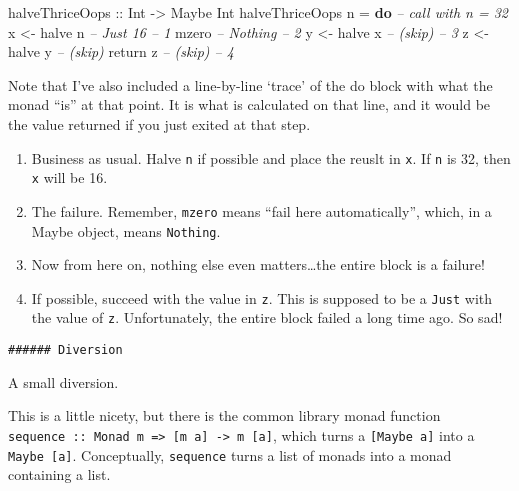 \documentclass[]{article}
\newenvironment{Shaded}{}{}
\newcommand{\KeywordTok}[1]{\textcolor[rgb]{0.00,0.44,0.13}{\textbf{{#1}}}}
\newcommand{\DataTypeTok}[1]{\textcolor[rgb]{0.56,0.13,0.00}{{#1}}}
\newcommand{\CommentTok}[1]{\textcolor[rgb]{0.38,0.63,0.69}{\textit{{#1}}}}
\newcommand{\OtherTok}[1]{\textcolor[rgb]{0.00,0.44,0.13}{{#1}}}
\newcommand{\FunctionTok}[1]{\textcolor[rgb]{0.02,0.16,0.49}{{#1}}}
\newcommand{\NormalTok}[1]{{#1}}
\begin{document}
\begin{Shaded}
\begin{Highlighting}[]
\OtherTok{halveThriceOops ::} \DataTypeTok{Int} \OtherTok{->} \DataTypeTok{Maybe} \DataTypeTok{Int}
\NormalTok{halveThriceOops n }\FunctionTok{=} \KeywordTok{do}          \CommentTok{-- call with n = 32}
    \NormalTok{x }\OtherTok{<-} \NormalTok{halve n                }\CommentTok{-- Just 16              -- 1}
    \NormalTok{mzero                       }\CommentTok{-- Nothing              -- 2}
    \NormalTok{y }\OtherTok{<-} \NormalTok{halve x                }\CommentTok{-- (skip)               -- 3}
    \NormalTok{z }\OtherTok{<-} \NormalTok{halve y                }\CommentTok{-- (skip)}
    \NormalTok{return z                    }\CommentTok{-- (skip)               -- 4}
\end{Highlighting}
\end{Shaded}

Note that I've also included a line-by-line `trace' of the do block with
what the monad ``is'' at that point. It is what is calculated on that
line, and it would be the value returned if you just exited at that
step.

\begin{enumerate}
\def\labelenumi{\arabic{enumi}.}
\tightlist
\item
  Business as usual. Halve \texttt{n} if possible and place the reuslt
  in \texttt{x}. If \texttt{n} is 32, then \texttt{x} will be 16.
\item
  The failure. Remember, \texttt{mzero} means ``fail here
  automatically'', which, in a Maybe object, means \texttt{Nothing}.
\item
  Now from here on, nothing else even matters\ldots{}the entire block is
  a failure!
\item
  If possible, succeed with the value in \texttt{z}. This is supposed to
  be a \texttt{Just} with the value of \texttt{z}. Unfortunately, the
  entire block failed a long time ago. So sad!
\end{enumerate}

\begin{verbatim}
###### Diversion
\end{verbatim}

A small diversion.

This is a little nicety, but there is the common library monad function
\texttt{sequence\ ::\ Monad\ m\ =\textgreater{}\ {[}m\ a{]}\ -\textgreater{}\ m\ {[}a{]}},
which turns a \texttt{{[}Maybe\ a{]}} into a \texttt{Maybe\ {[}a{]}}.
Conceptually, \texttt{sequence} turns a list of monads into a monad
containing a list.
\end{document}

